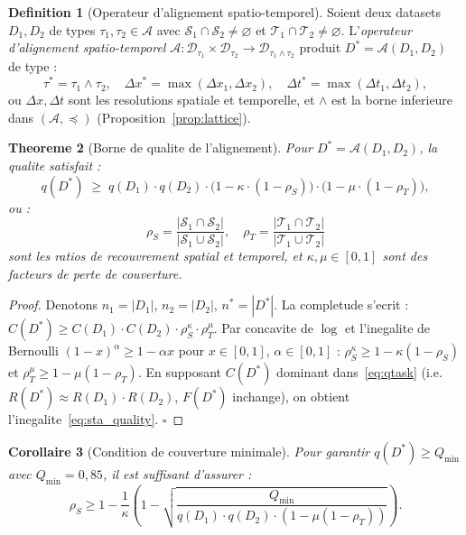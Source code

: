 \documentclass[12pt,a4paper]{article}
\theoremstyle{plain}
\newtheorem{theorem}{Theoreme}[section]
\newtheorem{corollary}[theorem]{Corollaire}
\theoremstyle{definition}
\newtheorem{definition}[theorem]{Definition}
\theoremstyle{remark}
\begin{document}
\begin{definition}[Operateur d'alignement spatio-temporel]
\label{def:sta}
Soient deux datasets $D_1, D_2$ de types $\tau_1, \tau_2 \in \mathcal{A}$
avec $\mathcal{S}_1 \cap \mathcal{S}_2 \neq \varnothing$ et
$\mathcal{T}_1 \cap \mathcal{T}_2 \neq \varnothing$.
L'\emph{operateur d'alignement spatio-temporel}
$\mathcal{A} : \mathcal{D}_{\tau_1} \times \mathcal{D}_{\tau_2}
\to \mathcal{D}_{\tau_1 \wedge \tau_2}$
produit $D^* = \mathcal{A}(D_1, D_2)$ de type :
\begin{equation}
\tau^* = \tau_1 \wedge \tau_2,\quad
\Delta x^* = \max(\Delta x_1, \Delta x_2),\quad
\Delta t^* = \max(\Delta t_1, \Delta t_2),
\label{eq:sta}
\end{equation}
ou $\Delta x, \Delta t$ sont les resolutions spatiale et temporelle,
et $\wedge$ est la borne inferieure dans $(\mathcal{A},\preceq)$
(Proposition~\ref{prop:lattice}).
\end{definition}

\begin{theorem}[Borne de qualite de l'alignement]
\label{thm:sta_quality}
Pour $D^* = \mathcal{A}(D_1, D_2)$, la qualite satisfait :
\begin{equation}
q(D^*) \;\geq\;
  q(D_1) \cdot q(D_2) \cdot
  \bigl(1 - \kappa \cdot (1-\rho_S)\bigr)
  \cdot \bigl(1 - \mu \cdot (1-\rho_T)\bigr),
\label{eq:sta_quality}
\end{equation}
ou :
\[
\rho_S = \frac{|\mathcal{S}_1 \cap \mathcal{S}_2|}{|\mathcal{S}_1\cup\mathcal{S}_2|},
\quad
\rho_T = \frac{|\mathcal{T}_1 \cap \mathcal{T}_2|}{|\mathcal{T}_1\cup\mathcal{T}_2|}
\]
sont les ratios de recouvrement spatial et temporel, et
$\kappa, \mu \in [0,1]$ sont des facteurs de perte de couverture.
\end{theorem}

\begin{proof}
Denotons $n_1 = |D_1|$, $n_2 = |D_2|$, $n^* = |D^*|$.
La completude s'ecrit :
$C(D^*) \geq C(D_1)\cdot C(D_2) \cdot \rho_S^{\kappa} \cdot \rho_T^{\mu}$.
Par concavite de $\log$ et l'inegalite de Bernoulli
$(1-x)^\alpha \geq 1-\alpha x$ pour $x \in [0,1]$, $\alpha \in [0,1]$ :
$\rho_S^{\kappa} \geq 1-\kappa(1-\rho_S)$
et $\rho_T^{\mu} \geq 1-\mu(1-\rho_T)$.
En supposant $C(D^*)$ dominant dans~\eqref{eq:qtask}
(i.e. $R(D^*) \approx R(D_1)\cdot R(D_2)$, $F(D^*)$ inchange),
on obtient l'inegalite~\eqref{eq:sta_quality}. \hfill$\square$
\end{proof}

\begin{corollary}[Condition de couverture minimale]
\label{cor:coverage}
Pour garantir $q(D^*) \geq Q_{\min}$ avec $Q_{\min}=0{,}85$, il est
suffisant d'assurer :
\begin{equation}
\rho_S \geq 1 - \frac{1}{\kappa}\left(1 -
  \sqrt{\frac{Q_{\min}}{q(D_1)\cdot q(D_2)\cdot (1-\mu(1-\rho_T))}}\right).
\label{eq:coverage_cond}
\end{equation}
\end{corollary}
\end{document}
